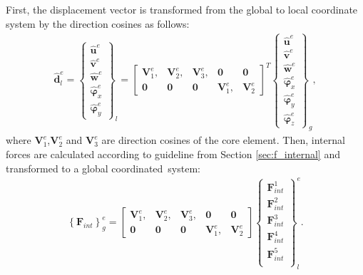\documentclass[sensors,article,accept,moreauthors,pdftex]{Definitions/mdpi}
\begin{document}
\begin{paracol}{2}
First, the displacement vector is transformed from the global to local coordinate system by the direction cosines as follows:
\begin{eqnarray}
	\widehat{\textbf{d}}^e_l = \left \{\begin{array}{c}
		\widehat{\textbf{u}}^e \\ \widehat{\textbf{v}}^e \\
		\widehat{\textbf{w}}^e \\ \widehat{\boldsymbol{\varphi}}_x^e \\
		\widehat{\boldsymbol{\varphi}}_y^e
	\end{array}\right \}_l = 
	\left [\begin{array}{ccccc}
		\textbf{V}^e_1, & \textbf{V}^e_2, & \textbf{V}^e_3, & \textbf{0} & \textbf{0} \\
		\textbf{0} & \textbf{0} & \textbf{0} & \textbf{V}^e_1, & \textbf{V}^e_2
	\end{array}\right ]^T
	\left \{\begin{array}{c}
	\widehat{\textbf{u}}^e \\ \widehat{\textbf{v}}^e \\
	\widehat{\textbf{w}}^e \\ \widehat{\boldsymbol{\varphi}}_x^e \\
	\widehat{\boldsymbol{\varphi}}_y^e\\
	\widehat{\boldsymbol{\varphi}}_z^e
\end{array}\right \}_g,
	\label{eq:d_local}
\end{eqnarray}
where \(\textbf{V}^e_1\),\(\textbf{V}^e_2\) and \(\textbf{V}^e_3\) are direction cosines of the core element. Then, internal forces are calculated according to guideline from Section \ref{sec:f_internal} and transformed to a global coordinated~system:
\begin{eqnarray}
	\left\{\textbf{F}_{int}\right\}^e_g =
	\left [\begin{array}{ccccc}
		\textbf{V}^e_1, & \textbf{V}^e_2, & \textbf{V}^e_3, & \textbf{0} & \textbf{0} \\
		\textbf{0} & \textbf{0} & \textbf{0} & \textbf{V}^e_1, & \textbf{V}^e_2
	\end{array}\right ]
	\left \{\begin{array}{c}
		\textbf{F}^1_{int} \\
		\textbf{F}^2_{int} \\
		\textbf{F}^3_{int} \\
		\textbf{F}^4_{int} \\
		\textbf{F}^5_{int} \\
	\end{array}\right \}_l^e.
	\label{eq:f_global}
\end{eqnarray}


\end{paracol}
\end{document}
